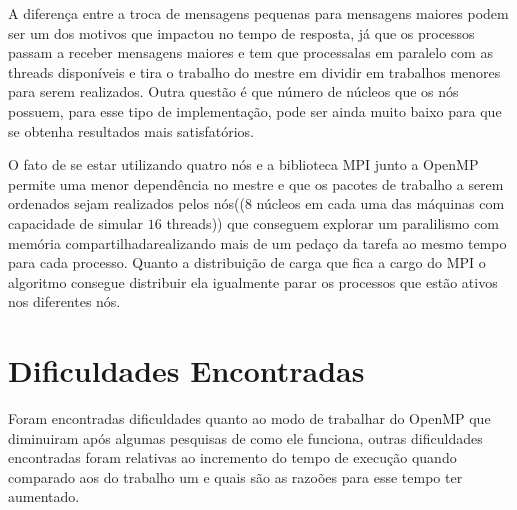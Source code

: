 \documentclass[11pt]{IEEEtran}
\begin{document}
	A diferença entre a troca de mensagens pequenas para mensagens maiores 
	podem ser um dos motivos que impactou no tempo de resposta, já que os processos
	passam a receber mensagens maiores e tem que processalas em paralelo com as 
	threads disponíveis e tira o trabalho do mestre em dividir em trabalhos
	menores para serem realizados. Outra questão é que número de núcleos que os nós 
	possuem, para esse tipo de implementação, pode ser ainda muito baixo para que se 
	obtenha resultados mais satisfatórios. 

	O fato de se estar utilizando quatro nós e a biblioteca MPI junto a OpenMP permite 
	uma menor dependência no mestre e que os pacotes de trabalho a serem ordenados sejam
	realizados pelos nós(($8$ núcleos em cada uma das máquinas com capacidade de simular $16$ 
	threads)) que conseguem explorar um paralilismo com memória compartilhadarealizando
	mais de um pedaço da tarefa ao mesmo tempo para cada processo. Quanto a	distribuição de 
	carga que fica a cargo do MPI o algoritmo consegue distribuir ela igualmente parar 
	os processos que estão ativos nos diferentes nós.

\section{Dificuldades Encontradas}

	Foram encontradas dificuldades quanto ao modo de trabalhar do OpenMP que diminuiram após algumas
	pesquisas de como ele funciona, outras dificuldades encontradas foram relativas ao incremento do tempo
	de execução quando comparado aos do trabalho um e quais são as razoões para esse tempo ter aumentado\@.
\end{document}
